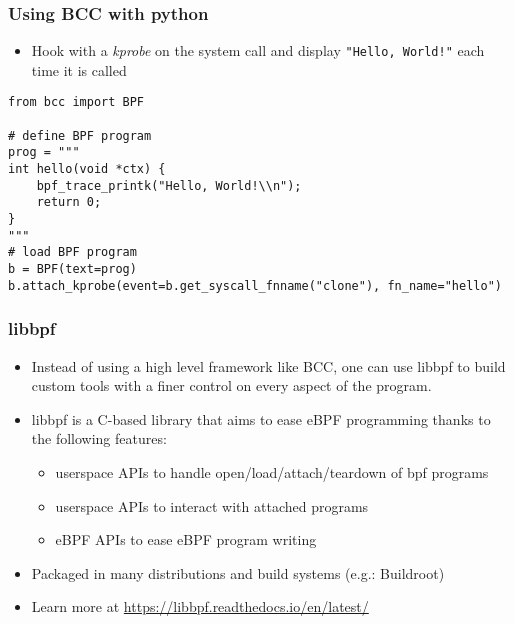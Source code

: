 \begin{frame}[fragile]
  \frametitle{Using BCC with python}
  \begin{itemize}
    \item Hook with a {\em kprobe} on the  system call and display \verb+"Hello, World!"+ each
          time it is called
  \end{itemize}
  \begin{block}{}
    \begin{verbatim}
from bcc import BPF

# define BPF program
prog = """
int hello(void *ctx) {
    bpf_trace_printk("Hello, World!\\n");
    return 0;
}
"""
# load BPF program
b = BPF(text=prog)
b.attach_kprobe(event=b.get_syscall_fnname("clone"), fn_name="hello")
    \end{verbatim}
  \end{block}
\end{frame}

\begin{frame}[fragile]
  \frametitle{libbpf}
  \begin{itemize}
    \item Instead of using a high level framework like BCC, one can use libbpf to
    build custom tools with a finer control on every aspect of the program.
    \item libbpf is a C-based library that aims to ease eBPF programming thanks
    to the following features:
    \begin{itemize}
      \item userspace APIs to handle open/load/attach/teardown of bpf programs
      \item userspace APIs to interact with attached programs
      \item eBPF APIs to ease eBPF program writing
    \end{itemize}
    \item Packaged in many distributions and build systems (e.g.: Buildroot)
    \item Learn more at \url{https://libbpf.readthedocs.io/en/latest/}
  \end{itemize}
\end{frame}

